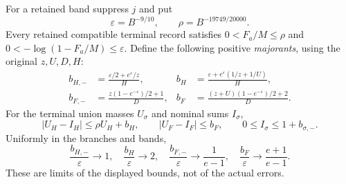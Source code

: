 \begin{proposition}
\label{prop:Mazur-genuine-boundaries}
For a retained band suppress $j$ and put
\[
 \varepsilon=B^{-9/10},\qquad \rho=B^{-19749/20000}.
\]
Every retained compatible terminal record satisfies
$0<F_a/M\le\rho$ and $0<-\log(1-F_a/M)\le\varepsilon$.
Define the following positive \emph{majorants}, using the original
$z,U,D,H$:
\begin{align*}
 b_{H,-}&=\frac{\varepsilon/2+e^\varepsilon/z}{H},&
 b_H&=\frac{\varepsilon+e^\varepsilon(1/z+1/U)}H,\\
 b_{F,-}&=\frac{z(1-e^{-\varepsilon})/2+1}{D},&
 b_F&=\frac{(z+U)(1-e^{-\varepsilon})/2+2}{D}.
\end{align*}
For the terminal union masses $U_\sigma$ and nominal sums $I_\sigma$,
\begin{equation}
 |U_H-I_H|\le\rho U_H+b_H,\qquad
 |U_F-I_F|\le b_F,\qquad
 0\le I_\sigma\le1+b_{\sigma,-}.
 \label{eq:Mazur-explicit-boundaries}
\end{equation}
Uniformly in the branches and bands,
\[
 \frac{b_{H,-}}{\varepsilon}\longrightarrow1,\quad
 \frac{b_H}{\varepsilon}\longrightarrow2,\quad
 \frac{b_{F,-}}{\varepsilon}\longrightarrow\frac1{e-1},\quad
 \frac{b_F}{\varepsilon}\longrightarrow\frac{e+1}{e-1}.
\]
These are limits of the displayed bounds, not of the actual errors.
\end{proposition}
